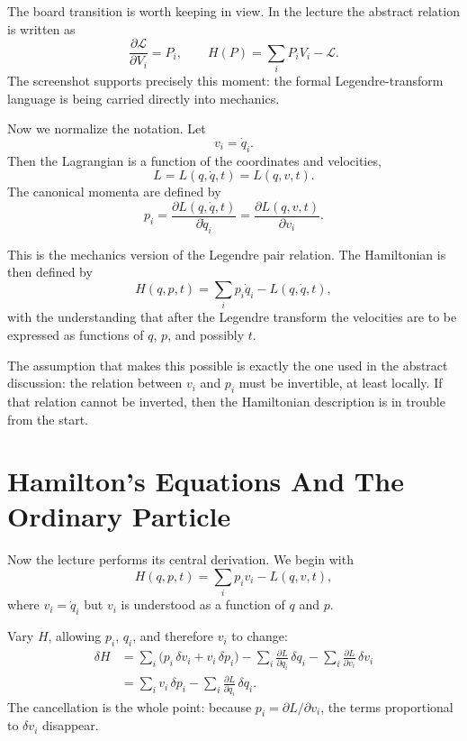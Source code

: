 The board transition is worth keeping in view. In the lecture the abstract relation is written as
\begin{equation}
\frac{\partial \mathcal{L}}{\partial V_i}=P_i,
\qquad
H(P)=\sum_i P_iV_i-\mathcal{L}.
\end{equation}
The screenshot supports precisely this moment: the formal Legendre-transform language is being carried directly into mechanics.

Now we normalize the notation. Let
\begin{equation}
v_i=\dot q_i .
\end{equation}
Then the Lagrangian is a function of the coordinates and velocities,
\begin{equation}
L=L(q,\dot q,t)=L(q,v,t).
\end{equation}
The canonical momenta are defined by
\begin{equation}
p_i=\frac{\partial L(q,\dot q,t)}{\partial \dot q_i}
=\frac{\partial L(q,v,t)}{\partial v_i}.
\end{equation}

This is the mechanics version of the Legendre pair relation. The Hamiltonian is then defined by
\begin{equation}
H(q,p,t)=\sum_i p_i \dot q_i - L(q,\dot q,t),
\end{equation}
with the understanding that after the Legendre transform the velocities are to be expressed as functions of \(q\), \(p\), and possibly \(t\).

The assumption that makes this possible is exactly the one used in the abstract discussion: the relation between \(v_i\) and \(p_i\) must be invertible, at least locally. If that relation cannot be inverted, then the Hamiltonian description is in trouble from the start.

\section{Hamilton's Equations And The Ordinary Particle}

Now the lecture performs its central derivation. We begin with
\begin{equation}
H(q,p,t)=\sum_i p_i v_i - L(q,v,t),
\end{equation}
where \(v_i=\dot q_i\) but \(v_i\) is understood as a function of \(q\) and \(p\).

Vary \(H\), allowing \(p_i\), \(q_i\), and therefore \(v_i\) to change:
\begin{align}
\delta H
&=
\sum_i \bigl(p_i\,\delta v_i + v_i\,\delta p_i\bigr)
-\sum_i \frac{\partial L}{\partial q_i}\,\delta q_i
-\sum_i \frac{\partial L}{\partial v_i}\,\delta v_i \\
&=
\sum_i v_i\,\delta p_i
-\sum_i \frac{\partial L}{\partial q_i}\,\delta q_i .
\end{align}
The cancellation is the whole point: because \(p_i=\partial L/\partial v_i\), the terms proportional to \(\delta v_i\) disappear.


